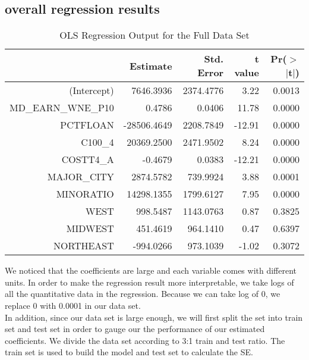 \documentclass{article}
\begin{document}
\subsection{overall regression results}
\begin{table}[H]
\centering
\begin{tabular}{rrrrr}
  \hline
 & Estimate & Std. Error & t value & Pr($>$$|$t$|$) \\ 
  \hline
(Intercept) & 7646.3936 & 2374.4776 & 3.22 & 0.0013 \\ 
  MD\_EARN\_WNE\_P10 & 0.4786 & 0.0406 & 11.78 & 0.0000 \\ 
  PCTFLOAN & -28506.4649 & 2208.7849 & -12.91 & 0.0000 \\ 
  C100\_4 & 20369.2500 & 2471.9502 & 8.24 & 0.0000 \\ 
  COSTT4\_A & -0.4679 & 0.0383 & -12.21 & 0.0000 \\ 
  MAJOR\_CITY & 2874.5782 & 739.9924 & 3.88 & 0.0001 \\ 
  MINORATIO & 14298.1355 & 1799.6127 & 7.95 & 0.0000 \\ 
  WEST & 998.5487 & 1143.0763 & 0.87 & 0.3825 \\ 
  MIDWEST & 451.4619 & 964.1410 & 0.47 & 0.6397 \\ 
  NORTHEAST & -994.0266 & 973.1039 & -1.02 & 0.3072 \\ 
   \hline
\end{tabular}
\caption{OLS Regression Output for the Full Data Set} 
\end{table}
We noticed that the coefficients are large and each variable comes with different units. In order to make the regression result more interpretable, we take logs of all the quantitative data in the regression. Because we can take log of 0, we replace 0 with 0.0001 in our data set.\\

In addition, since our data set is large enough, we will first split the set into train set and test set in order to gauge our the performance of our estimated coefficients. We divide the data set according to 3:1 train and test ratio. The train set is used to build the model and test set to calculate the SE.\\
\end{document}
